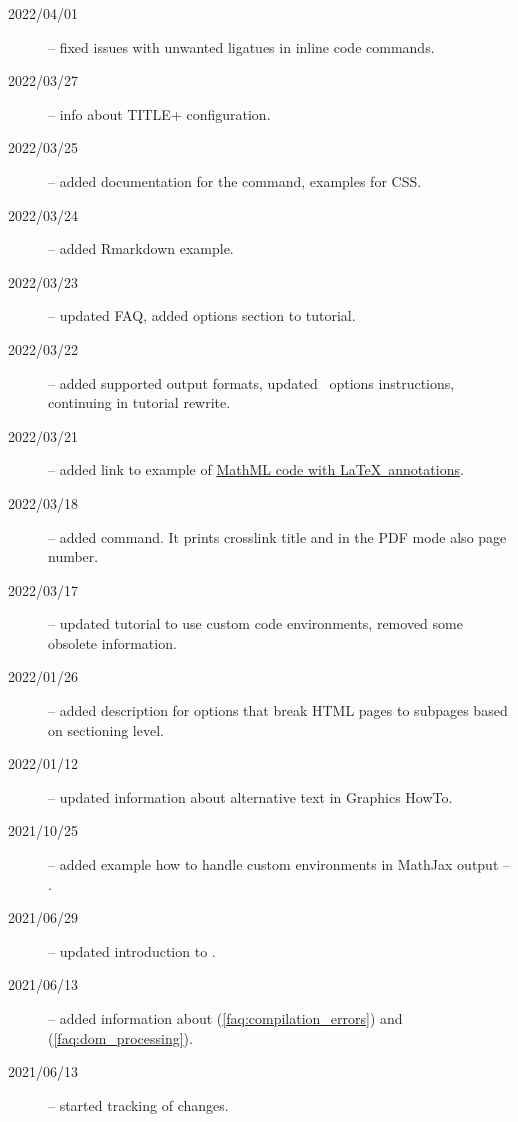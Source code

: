 \begin{description}
  \item[2022/04/01] -- fixed issues with unwanted ligatues in inline code commands.
  \item[2022/03/27] -- info about TITLE+ configuration.
  \item[2022/03/25] -- added documentation for the  command, examples for CSS.
  \item[2022/03/24] -- added Rmarkdown example.
  \item[2022/03/23] -- updated FAQ, added options section to tutorial.
  \item[2022/03/22] -- added supported output formats, updated \fourhtsty\ options instructions, continuing in tutorial rewrite.
  \item[2022/03/21] -- added link to example of \href{https://tex.stackexchange.com/a/637910/2891}{MathML code with \LaTeX\ annotations}.
  \item[2022/03/18] -- added \texcommand{\namerefpage} command. It prints crosslink title and in the PDF mode also page number.
  \item[2022/03/17] -- updated tutorial to use custom code environments, removed some obsolete information.
  \item[2022/01/26] -- added description for options that break HTML pages to subpages based on sectioning level.
  \item[2022/01/12] -- updated information about alternative text in Graphics HowTo.
  \item[2021/10/25] -- added example how to handle custom environments in MathJax output -- .
  \item[2021/06/29] -- updated introduction to .
  \item[2021/06/13] -- added information  about  (\ref{faq:compilation_errors}) and  (\ref{faq:dom_processing}).
  \item[2021/06/13] -- started tracking of changes.
\end{description}
